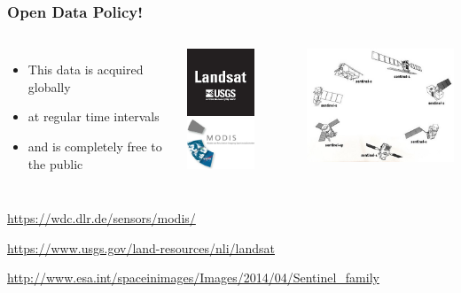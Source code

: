 \begin{frame}
	\frametitle{Open Data Policy!}
	
	
	\begin{columns}[t]
		
		\Large
		\begin{itemize}
			\item This data is acquired globally
			\item at regular time intervals
			\item and is completely free to the public
		\end{itemize}
		
		\vspace{1em}
		\hspace{2em}\includegraphics[width=2cm]{images/usgs}
		\hspace{1em}
		\includegraphics[width=2cm]{images/modis_icon}
		
		
		\includegraphics[width=6cm]{images/SentinelFleet}
		
	\end{columns}

	\vspace{1em}
	
	\small
	
	\url{https://wdc.dlr.de/sensors/modis/}
	
	\url{https://www.usgs.gov/land-resources/nli/landsat}
	
	\url{http://www.esa.int/spaceinimages/Images/2014/04/Sentinel_family}
	
	
\end{frame}

